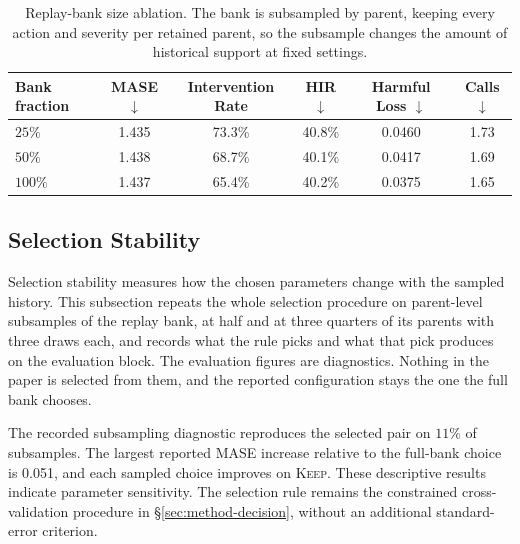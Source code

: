 \documentclass{article}
\begin{document}
\begin{table}[htbp]
  \caption{Replay-bank size ablation. The bank is subsampled by parent, keeping
  every action and severity per retained parent, so the subsample changes the amount of
  historical support at fixed settings.}
  \label{tab:app-replaysize}
  \centering
  \small
  \setlength{\tabcolsep}{4pt}
  \begin{tabular}{lccccc}
    \toprule
    Bank fraction & MASE $\downarrow$ & Intervention Rate & HIR $\downarrow$ & Harmful Loss $\downarrow$ & Calls $\downarrow$ \\
    \midrule
    $25\%$  & 1.435  & 73.3\%  & 40.8\%  & 0.0460  & 1.73 \\
    $50\%$  & 1.438  & 68.7\%  & 40.1\%  & 0.0417  & 1.69 \\
    $100\%$ & 1.437 & 65.4\% & 40.2\% & 0.0375 & 1.65 \\
    \bottomrule
  \end{tabular}
\end{table}

\subsection{Selection Stability}
\label{app:selstability}
Selection stability measures how the chosen parameters change with the sampled history. This subsection repeats the whole selection procedure on parent-level
subsamples of the replay bank, at half and at three quarters of its parents with three draws
each, and records what the rule picks and what that pick produces on the evaluation block. The
evaluation figures are diagnostics. Nothing in the paper is selected from them, and the
reported configuration stays the one the full bank chooses.

The recorded subsampling diagnostic reproduces the selected pair on $11\%$ of subsamples.
The largest reported MASE increase relative to the full-bank choice is 0.051, and each sampled
choice improves on \textsc{Keep}. These descriptive results indicate parameter sensitivity.
The selection rule remains the constrained cross-validation procedure in
\S\ref{sec:method-decision}, without an additional standard-error criterion.
\end{document}
